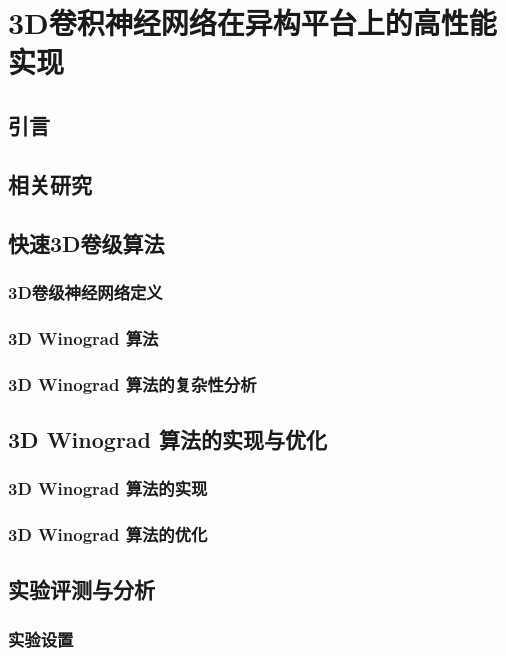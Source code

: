 \chapter{3D卷积神经网络在异构平台上的高性能实现}
\label{chapijcv}

\section{引言}

\section{相关研究}


\section{快速3D卷级算法}


\subsection{3D卷级神经网络定义}

\subsection{3D Winograd 算法}

\subsection{3D Winograd 算法的复杂性分析}


\section{3D Winograd 算法的实现与优化}

\subsection{3D Winograd 算法的实现}

\subsection{3D Winograd 算法的优化}


\section{实验评测与分析}
\subsection{实验设置}


